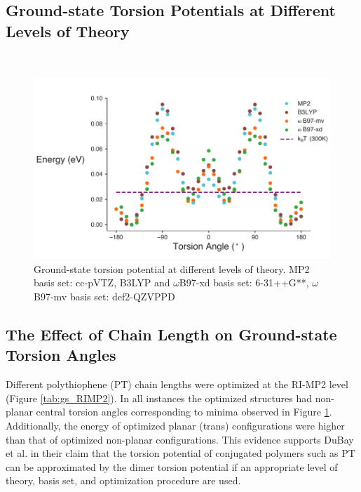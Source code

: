 \subsection{Ground-state Torsion Potentials at Different Levels of Theory}
\
\begin{figure}[hbt!]
    \centering
    \includegraphics{figures/append_tor_model/SI_compare_theory_torsion.pdf}
    \caption{Ground-state torsion potential at different levels of theory. MP2 basis set: cc-pVTZ, B3LYP and $\omega$B97-xd basis set: 6-31++G**, $\omega$B97-mv basis set: def2-QZVPPD}
    \label{fig:gs_theory}
\end{figure}

\subsection{The Effect of Chain Length on Ground-state Torsion Angles}
\label{subsec:chain_length_gs}

Different polythiophene (PT) chain lengths were optimized at the RI-MP2 level (Figure \ref{tab:gs_RIMP2}). In all instances the optimized structures had non-planar central torsion angles corresponding to minima observed in Figure \ref{fig:gs_theory}. Additionally, the energy of optimized planar (trans) configurations were higher than that of optimized non-planar configurations. This evidence supports DuBay et al. in their claim that the torsion potential of conjugated polymers such as PT can be approximated by the dimer torsion potential if an appropriate level of theory, basis set, and optimization procedure are used.\cite{Dubay2012}

